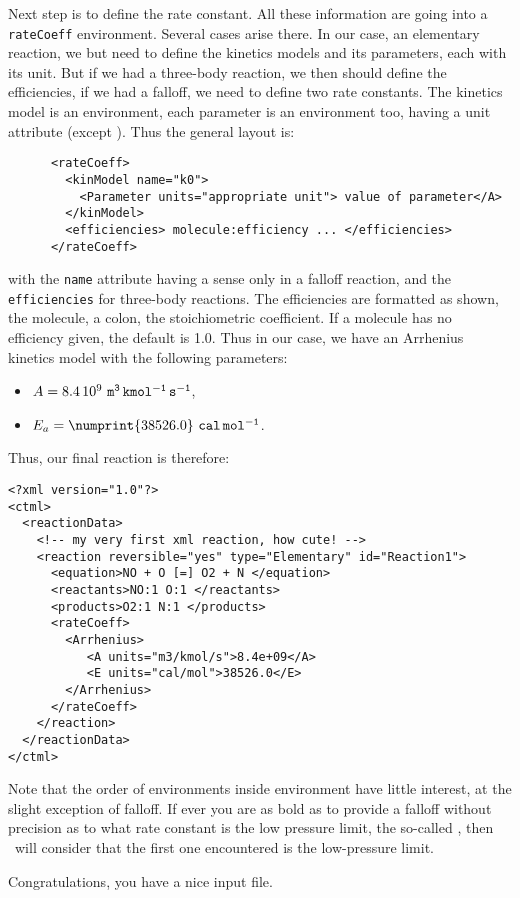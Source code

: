 Next step is to define the rate constant. All these information
are going into a \verb!rateCoeff! environment. Several cases arise
there. In our case, an elementary reaction, we but need to define
the kinetics models and its parameters, each with its unit. But
if we had a three-body reaction, we then should define the efficiencies,
if we had a falloff, we need to define two rate constants.
The kinetics model is an environment, each parameter is an environment
too, having a unit attribute (except \Power).
Thus the general layout is:
\begin{verbatim}
      <rateCoeff>
        <kinModel name="k0">
          <Parameter units="appropriate unit"> value of parameter</A>
        </kinModel>
        <efficiencies> molecule:efficiency ... </efficiencies>
      </rateCoeff>
\end{verbatim}
with the \verb!name! attribute having a sense only in a falloff
reaction, and the \verb!efficiencies! for three-body reactions.
The efficiencies are formatted as shown, the molecule, a colon, the
stoichiometric coefficient. If a molecule has no efficiency
given, the default is 1.0.
Thus in our case, we have an Arrhenius kinetics model with the
following parameters:
\begin{itemize}
\item $A = 8.4\,10^9~\mathtt{m^3\,kmol^{-1}\,s^{-1}}$,
\item $\AcEn = \numprint{38526.0}~\unit{cal\,mol^{-1}}$.
\end{itemize}
Thus, our final reaction is therefore:
\begin{verbatim}
<?xml version="1.0"?>
<ctml>
  <reactionData>
    <!-- my very first xml reaction, how cute! -->
    <reaction reversible="yes" type="Elementary" id="Reaction1">
      <equation>NO + O [=] O2 + N </equation>
      <reactants>NO:1 O:1 </reactants>
      <products>O2:1 N:1 </products>
      <rateCoeff>
        <Arrhenius>
           <A units="m3/kmol/s">8.4e+09</A>
           <E units="cal/mol">38526.0</E>
        </Arrhenius>
      </rateCoeff>
    </reaction>
  </reactionData>
</ctml>
\end{verbatim}
Note that the order of environments inside environment have little
interest, at the slight exception of falloff. If ever you are
as bold as to provide a falloff without precision as to what rate
constant is the low pressure limit, the so-called \kinModZ, then
\Antioch\ will consider that the first one encountered is the
low-pressure limit.

Congratulations, you have a nice input file.
